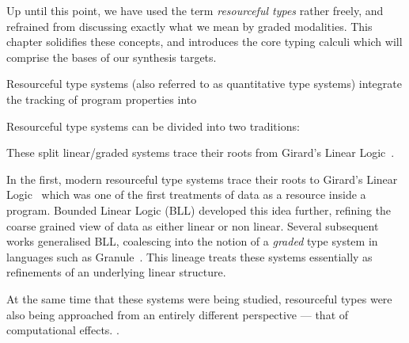 Up until this point, we have used the term \textit{resourceful types} rather
freely, and refrained from discussing exactly what we mean by graded modalities.
This chapter solidifies these concepts, and introduces the core typing calculi
which will comprise the bases of our synthesis targets.    

Resourceful type systems (also referred to as quantitative type systems)
integrate the tracking of program properties into 

Resourceful type systems can be divided into two traditions: 

These split linear/graded systems trace their roots from Girard's Linear Logic~\cite{}. 

In the first, modern resourceful type systems trace their roots to Girard's Linear Logic~\cite{}
which was one of the first treatments of data as a resource inside a program.
Bounded Linear Logic (BLL) developed this idea further, refining the coarse
grained view of data as either linear or non linear. Several subsequent works
generalised BLL, coalescing into the notion of a \textit{graded} type system in
languages such as Granule~\cite{}. This lineage treats these systems essentially
as refinements of an underlying linear structure.

At the same time that these systems were being studied, resourceful types were
also being approached from an entirely different perspective --- that of
computational effects. .

